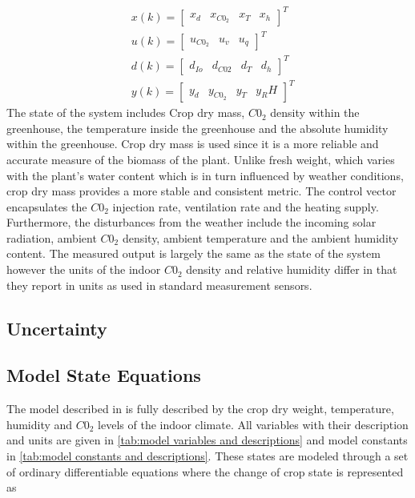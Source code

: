 \begin{equation}
	\begin{aligned}
		& x(k) = \begin{bmatrix}
			x_d & x_{C0_2} & x_T & x_h
		\end{bmatrix}^T
		\\
		& u(k) = \begin{bmatrix}
			u_{C0_2} & u_{v} & u_q
		\end{bmatrix}^T
		\\
		& d(k) = \begin{bmatrix}
			d_{Io} & d_{C02} & d_T& d_h
		\end{bmatrix}^T
		\\
		& y(k) = \begin{bmatrix}
			y_d & y_{C0_2} & y_T & y_RH
		\end{bmatrix}^T
	\end{aligned}
	\label{eq: model vectors}
\end{equation}
The state of the system includes Crop dry mass, $C0_2$ density within the greenhouse, the temperature inside the greenhouse and the absolute humidity within the greenhouse. Crop dry mass is used since it is a more reliable and accurate measure of the biomass of the plant. Unlike fresh weight, which varies with the plant's water content which is in turn influenced by weather conditions, crop dry mass provides a more stable and consistent metric. The control vector encapsulates the $C0_2$ injection rate, ventilation rate and the heating supply. Furthermore, the disturbances from the weather include the incoming solar radiation, ambient $C0_2$ density, ambient temperature and the ambient humidity content. The measured output is largely the same as the state of the system however the units of the indoor $C0_2$ density and relative humidity differ in that they report in units as used in standard measurement sensors.

\subsection{Uncertainty}

\subsection {Model State Equations}

The model described in \cite{hentenGreenhouseClimateManagement1994} is fully described by the crop dry weight, temperature, humidity and $C0_2$ levels of the indoor climate. All variables with their description and units are given in \autoref{tab:model variables and descriptions} and model constants in \autoref{tab:model constants and descriptions}. These states are modeled through a set of ordinary differentiable equations where the change of crop state is represented as

